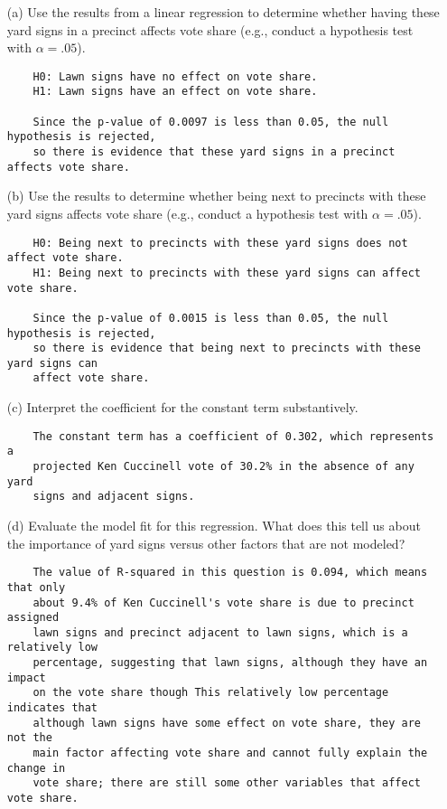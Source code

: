 \documentclass[12pt,letterpaper]{article}
\begin{document}
\vspace{.5cm}
\begin{enumerate}
	\item [(a)] Use the results from a linear regression to determine whether having these yard signs in a precinct affects vote share (e.g., conduct a hypothesis test with $\alpha = .05$).
	
	 
	
	\begin{verbatim}
	H0: Lawn signs have no effect on vote share.
	H1: Lawn signs have an effect on vote share.	
		
	Since the p-value of 0.0097 is less than 0.05, the null hypothesis is rejected, 
	so there is evidence that these yard signs in a precinct affects vote share.
	\end{verbatim} 
	
	\item [(b)]  Use the results to determine whether being
	next to precincts with these yard signs affects vote
	share (e.g., conduct a hypothesis test with $\alpha = .05$).
	
	 

	\begin{verbatim}
	H0: Being next to precincts with these yard signs does not affect vote share.
	H1: Being next to precincts with these yard signs can affect vote share.
	
	Since the p-value of 0.0015 is less than 0.05, the null hypothesis is rejected, 
	so there is evidence that being next to precincts with these yard signs can 
	affect vote share.
	\end{verbatim} 
	
	\item [(c)] Interpret the coefficient for the constant term substantively.
	
	\begin{verbatim}
	The constant term has a coefficient of 0.302, which represents a 
	projected Ken Cuccinell vote of 30.2% in the absence of any yard 
	signs and adjacent signs.
	\end{verbatim} 

	\item [(d)] Evaluate the model fit for this regression.  What does this	tell us about the importance of yard signs versus other factors that are not modeled?
	
	\begin{verbatim}
	The value of R-squared in this question is 0.094, which means that only 
	about 9.4% of Ken Cuccinell's vote share is due to precinct assigned 
	lawn signs and precinct adjacent to lawn signs, which is a relatively low 
	percentage, suggesting that lawn signs, although they have an impact 
	on the vote share though This relatively low percentage indicates that 
	although lawn signs have some effect on vote share, they are not the 
	main factor affecting vote share and cannot fully explain the change in 
	vote share; there are still some other variables that affect vote share.
	\end{verbatim} 
	
\end{enumerate}  
\end{document}
